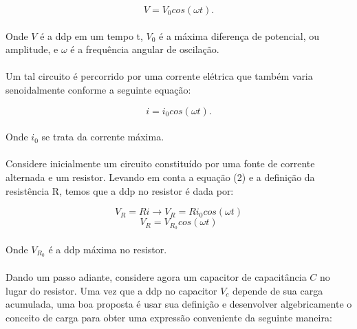 \documentclass[a4paper, 12pt]{article}
\begin{document}
\begin{multicols}{2}
\begin{equation}
V = V_0cos(\omega t).
\end{equation}

\paragraph{} Onde $V$ é a ddp em um tempo t, $V_0$ é a máxima diferença de potencial, ou amplitude, e $\omega$ é a frequência angular de oscilação.

\paragraph{} Um tal circuito é percorrido por uma corrente elétrica que também varia senoidalmente conforme a seguinte equação:

\begin{equation}
i=i_0cos(\omega t).
\end{equation}

\paragraph{} Onde $i_0$ se trata da corrente máxima.

\paragraph{} Considere inicialmente um circuito constituído por uma fonte de corrente alternada e um resistor. Levando em conta a equação (2) e a definição da resistência R, temos que a ddp no resistor é dada por:

\begin{equation}
V_R = Ri \rightarrow V_R = Ri_0cos(\omega t)
\end{equation}
\begin{equation}
V_R = V_{R_0}cos(\omega t)
\end{equation}

\paragraph{} Onde $V_{R_0}$ é a ddp máxima no resistor.

\paragraph{} Dando um passo adiante, considere agora um capacitor de capacitância $C$ no lugar do resistor. Uma vez que a ddp no capacitor $V_c$ depende de sua carga acumulada, uma boa proposta é usar sua definição e desenvolver algebricamente o conceito de carga para obter uma expressão conveniente da seguinte maneira:


\end{multicols}
\end{document}
